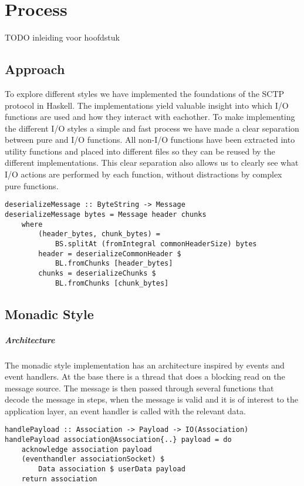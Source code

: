 \chapter{Process}
TODO inleiding voor hoofdstuk
\section{Approach}
To explore different styles we have implemented the foundations of the SCTP protocol\cite{_rfc_????} in Haskell. The implementations yield valuable insight into which I/O functions are used and how they interact with eachother.
To make implementing the different I/O styles a simple and fast process we have made a clear separation between pure and I/O functions. All non-I/O functions have been extracted into utility functions and placed into different files so they can be reused by the different implementations. This clear separation also allows us to clearly see what I/O actions are performed by each function, without distractions by complex pure functions.

\begin{lstlisting}[caption={An example of a shared pure function}]
deserializeMessage :: ByteString -> Message
deserializeMessage bytes = Message header chunks
    where
        (header_bytes, chunk_bytes) =
            BS.splitAt (fromIntegral commonHeaderSize) bytes
        header = deserializeCommonHeader $
            BL.fromChunks [header_bytes]
        chunks = deserializeChunks $
            BL.fromChunks [chunk_bytes]
\end{lstlisting}
\section{Monadic Style}
\paragraph{Architecture}
The monadic style implementation has an architecture inspired by events and event handlers. At the base there is a thread that does a blocking read on the message source. The message is then passed through several functions that decode the message in steps, when the message is valid and it is of interest to the application layer, an event handler is called with the relevant data.

\begin{lstlisting}[caption={The eventhandler is called when a payload is received}]
handlePayload :: Association -> Payload -> IO(Association)
handlePayload association@Association{..} payload = do 
    acknowledge association payload
    (eventhandler associationSocket) $
	    Data association $ userData payload
    return association
\end{lstlisting}

